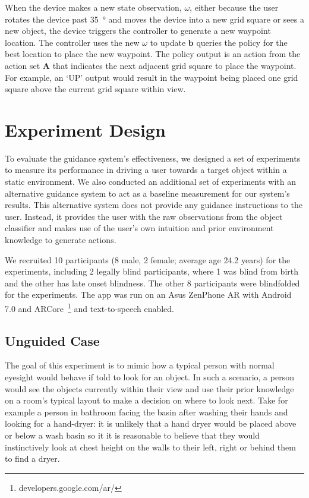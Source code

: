 \documentclass[runningheads]{llncs}
\begin{document}
When the device makes a new state observation, $\omega$, either because the user rotates the device past \SI{35}{\degree} and moves the device into a new grid square or sees a new object, the device triggers the controller to generate a new waypoint location.
The controller uses the new $\omega$ to update $\mathbf{b}$ queries the policy for the best location to place the new waypoint. 
The policy output is an action from the action set $\mathbf{A}$ that indicates the next adjacent grid square to place the waypoint.
For example, an `UP' output would result in the waypoint being placed one grid square above the current grid square within view. 

\section{Experiment Design}\label{sec:experiments}

To evaluate the guidance system's effectiveness, we designed a set of experiments to measure its performance in driving a user towards a target object within a static environment. 
We also conducted an additional set of experiments with an alternative guidance system to act as a baseline measurement for our system's results. 
This alternative system does not provide any guidance instructions to the user.
Instead, it provides the user with the raw observations from the object classifier and makes use of the user's own intuition and prior environment knowledge to generate actions. 

We recruited 10 participants (8 male, 2 female; average age 24.2 years) for the experiments, including 2 legally blind participants, where 1 was blind from birth and the other has late onset blindness.
The other 8 participants were blindfolded for the experiments. 
The app was run on an Asus ZenPhone AR with Android 7.0 and ARCore~\footnote{developers.google.com/ar/} and text-to-speech enabled. 

\subsection{Unguided Case}

The goal of this experiment is to mimic how a typical person with normal eyesight would behave if told to look for an object. 
In such a scenario, a person would see the objects currently within their view and use their prior knowledge on a room's typical layout to make a decision on where to look next.
Take for example a person in bathroom facing the basin after washing their hands and looking for a hand-dryer: it is unlikely that a hand dryer would be placed above or below a wash basin so it it is reasonable to believe that they would instinctively look at chest height on the walls to their left, right or behind them to find a dryer. 
\end{document}
